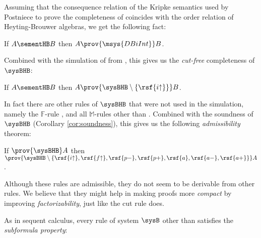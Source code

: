 Assuming that the consequence relation of the Kripke semantics used by Postniece
to prove the completeness of  coincides with the order relation of
Heyting-Brouwer algebras, we get the following fact:

\begin{fact}
  If $A \sementHB B$ then $A \prov{\msys{DBiInt}} B$.
\end{fact}

Combined with the simulation of  from ,
this gives us the \emph{cut-free} completeness of $\sysBHB$:

\begin{theorem}
  If $A \sementHB B$ then $A \prov{\sysBHB \setminus \{\rsf{i{\uparrow}}\}} B$.
\end{theorem}

In fact there are other rules of $\sysBHB$ that were not used in the simulation,
namely the $\mathbb{F}$-rule , and all $\mathbb{M}$-rules other
than . Combined with the soundness of $\sysBHB$ (Corollary
\ref{cor:soundness}), this gives us the following \emph{admissibility} theorem:

\begin{theorem}[Admissibility]

  If $\prov{\sysBHB} A$ then $\prov{\sysBHB \setminus
  \{\rsf{i{\uparrow}},\rsf{f{\uparrow}},\rsf{p{-}},\rsf{p{+}},\rsf{a},\rsf{a{-}},\rsf{a{+}}\}}
  A$.
\end{theorem}

Although these rules are admissible, they do not seem to be derivable from other
rules. We believe that they might help in making proofs more \emph{compact} by
improving \emph{factorizability}, just like the cut rule does.

As in sequent calculus, every rule of system $\sysB$ other than
 satisfies the \emph{subformula property}:

